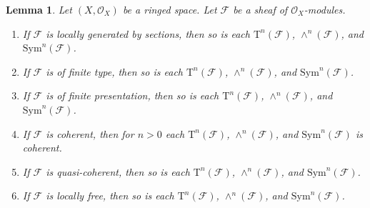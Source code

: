 \documentclass{stacks-project}
\theoremstyle{plain}
\newtheorem{lemma}[subsection]{Lemma}
\theoremstyle{definition}
\theoremstyle{remark}
\numberwithin{equation}{subsection}
\begin{document}
\begin{lemma}
\label{lemma-tensor-algebra-permanence}
Let $(X, \mathcal{O}_X)$ be a ringed space.
Let $\mathcal{F}$ be a sheaf of $\mathcal{O}_X$-modules.
\begin{enumerate}
\item If $\mathcal{F}$ is locally generated by sections,
then so is each $\text{T}^n(\mathcal{F})$,
$\wedge^n(\mathcal{F})$, and $\text{Sym}^n(\mathcal{F})$.
\item If $\mathcal{F}$ is of finite type,
then so is each $\text{T}^n(\mathcal{F})$,
$\wedge^n(\mathcal{F})$, and $\text{Sym}^n(\mathcal{F})$.
\item If $\mathcal{F}$ is of finite presentation,
then so is each $\text{T}^n(\mathcal{F})$,
$\wedge^n(\mathcal{F})$, and $\text{Sym}^n(\mathcal{F})$.
\item If $\mathcal{F}$ is coherent,
then for $n > 0$ each $\text{T}^n(\mathcal{F})$,
$\wedge^n(\mathcal{F})$, and $\text{Sym}^n(\mathcal{F})$
is coherent.
\item If $\mathcal{F}$ is quasi-coherent,
then so is each $\text{T}^n(\mathcal{F})$,
$\wedge^n(\mathcal{F})$, and $\text{Sym}^n(\mathcal{F})$.
\item If $\mathcal{F}$ is locally free,
then so is each $\text{T}^n(\mathcal{F})$,
$\wedge^n(\mathcal{F})$, and $\text{Sym}^n(\mathcal{F})$.
\end{enumerate}
\end{lemma}
\end{document}
